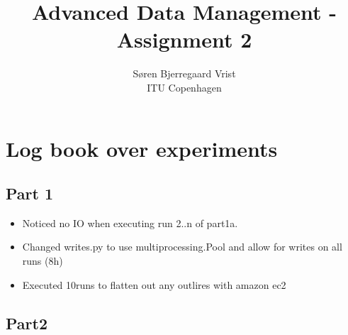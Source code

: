
\title{Advanced Data Management - Assignment 2}
\author{S\o ren Bjerregaard Vrist\\ITU Copenhagen}


\maketitle


\chapter{Log book over experiments}

\section{Part 1}
\begin{itemize}
  \item Noticed no IO when executing run 2..n of part1a.
  \item Changed writes.py to use multiprocessing.Pool and allow for writes on
    all runs (8h)
  \item Executed 10runs to flatten out any outlires with amazon ec2
\end{itemize}

\section{Part2}


